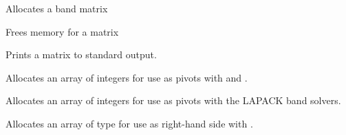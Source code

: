\documentclass[letterpaper,10pt,english]{sphinxmanual}
\begin{document}
\begin{fulllineitems}
\label{linear_solvers/DLS:c.NewBandMat}
Allocates a {\hyperref[linear_solvers/DLS:c.DlsMat]{\emph{}}} band matrix

\end{fulllineitems}


\begin{fulllineitems}
Frees memory for a {\hyperref[linear_solvers/DLS:c.DlsMat]{\emph{}}} matrix

\end{fulllineitems}


\begin{fulllineitems}
Prints a {\hyperref[linear_solvers/DLS:c.DlsMat]{\emph{}}} matrix to standard output.

\end{fulllineitems}


\begin{fulllineitems}
Allocates an array of  integers for use as pivots with
 and .

\end{fulllineitems}


\begin{fulllineitems}
Allocates an array of  integers for use as pivots with the
LAPACK band solvers.

\end{fulllineitems}


\begin{fulllineitems}
Allocates an array of type  for use as right-hand side
with .

\end{fulllineitems}
\end{document}
